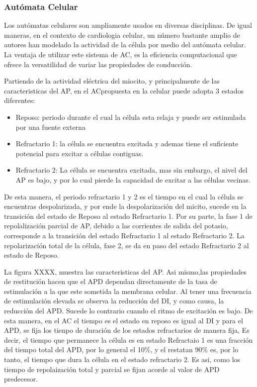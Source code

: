 \subsubsection{Autómata Celular }


Los autómatas celulares son ampliamente usados en diversas disciplinas. De igual
maneras, en el contexto de cardiologia celular, un número bastante amplio de
autores han modelado la actividad de la célula por medio del autómata celular.
La ventaja de utilizar este sistema de \ac{AC}, es la eficiencia
computacional que ofrece la versatilidad de variar las propiedades de conducción.

Partiendo de la actividad eléctrica del miocito,  y principalmente de las
caracteristicas del \ac{AP}, en el \ac{AC}propuesta en
\cite{Alonso-Atienza05} la celular puede adopta 3 estados diferentes:


\begin{itemize}
\item Reposo: periodo  durante el cual la célula esta relaja  y puede ser
estimulada por una fuente externa
\item Refractario 1: la célula se encuentra excitada  y ademas tiene el
suficiente potencial para excitar a células contiguas.
\item Refractario 2: La célula se encuentra excitada, mas sin embargo, el nivel
del \ac{AP} es bajo, y por lo cual pierde la capacidad de excitar a las células
vecinas.
\end{itemize}

De esta manera, el periodo refractario 1 y 2 es el tiempo  en el cual la célula
se encuentras despolarizada, y  por ende la despolarización del micito, sucede
en la transición del estado de Reposo al estado Refractario 1. Por su parte, la
fase 1 de repolalización parcial de \ac{AP}, debido a las corrientes de salida
del potasio, corresponde a la transición del estado Refractario 1 al estado
Refractario 2. La repolarización total de la célula, fase 2, se da en paso del
estado Refractario 2 al estado de Reposo.


La figura XXXX, muestra las caracteristicas del \ac{AP}. Asi mismo,las
propiedades de restitución hacen que el \ac{APD} dependan directamente de la
tasa de estimulación a la que este sometida la membrana celular. Al tener una
frecuencia de estimulación elevada  se observa la reducción del \ac{DI}, y como causa, la
reducción del \ac{APD}. Sucede lo contrario cuando el ritmo de excitación es
bajo. De esta manera, en el \ac{AC} el tiempo es el estado en reposo es
igual al \ac{DI} y para el \ac{APD}, se fija los tienpo de duración de los
estados refractarios de manera fija, Es decir, el tiempo que permanece
la célula es en estado Refractaio 1 es una fracción del tiempo total del
\ac{APD}, por lo general el 10\%, y el restatan 90\% es, por lo tanto, el tiempo
que dura la célula en el estado refractario 2. Es asi, como los tiempo de
repolaización total y parcial se fijan acorde al valor de \ac{APD} predecesor.

